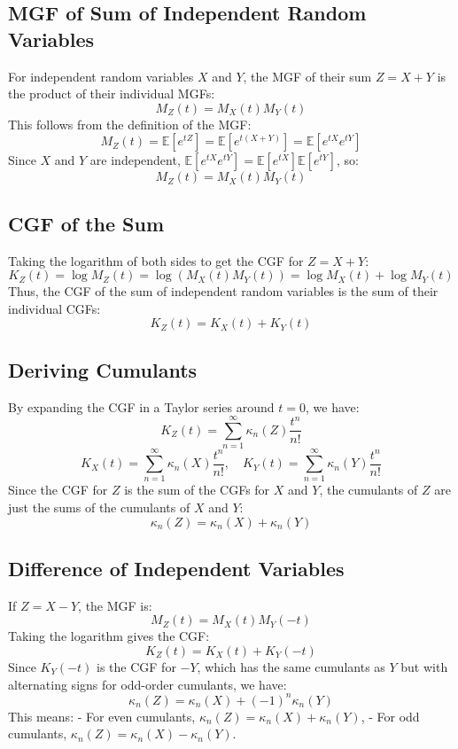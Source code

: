 \documentclass[11pt]{article}
\begin{document}
		\subsection*{MGF of Sum of Independent Random Variables}
		For independent random variables \( X \) and \( Y \), the MGF of their sum \( Z = X + Y \) is the product of their individual MGFs:
		\[
		M_Z(t) = M_X(t) M_Y(t)
		\]
		This follows from the definition of the MGF:
		\[
		M_Z(t) = \mathbb{E}[e^{tZ}] = \mathbb{E}[e^{t(X + Y)}] = \mathbb{E}[e^{tX} e^{tY}]
		\]
		Since \( X \) and \( Y \) are independent, \( \mathbb{E}[e^{tX} e^{tY}] = \mathbb{E}[e^{tX}] \mathbb{E}[e^{tY}] \), so:
		\[
		M_Z(t) = M_X(t) M_Y(t)
		\]
			
		\subsection*{CGF of the Sum}
		Taking the logarithm of both sides to get the CGF for \( Z = X + Y \):
		\[
		K_Z(t) = \log M_Z(t) = \log(M_X(t) M_Y(t)) = \log M_X(t) + \log M_Y(t)
		\]
		Thus, the CGF of the sum of independent random variables is the sum of their individual CGFs:
		\[
		K_Z(t) = K_X(t) + K_Y(t)
		\]
			
		\subsection*{Deriving Cumulants}
		By expanding the CGF in a Taylor series around \( t = 0 \), we have:
		\[
		K_Z(t) = \sum_{n=1}^{\infty} \kappa_n(Z) \frac{t^n}{n!}
		\]
		\[
		K_X(t) = \sum_{n=1}^{\infty} \kappa_n(X) \frac{t^n}{n!}, \quad K_Y(t) = \sum_{n=1}^{\infty} \kappa_n(Y) \frac{t^n}{n!}
		\]
		Since the CGF for \( Z \) is the sum of the CGFs for \( X \) and \( Y \), the cumulants of \( Z \) are just the sums of the cumulants of \( X \) and \( Y \):
		\[
		\kappa_n(Z) = \kappa_n(X) + \kappa_n(Y)
		\]
			
		\subsection*{Difference of Independent Variables}
		If \( Z = X - Y \), the MGF is:
		\[
		M_Z(t) = M_X(t) M_Y(-t)
		\]
		Taking the logarithm gives the CGF:
		\[
		K_Z(t) = K_X(t) + K_Y(-t)
		\]
		Since \( K_Y(-t) \) is the CGF for \( -Y \), which has the same cumulants as \( Y \) but with alternating signs for odd-order cumulants, we have:
		\[
		\kappa_n(Z) = \kappa_n(X) + (-1)^n \kappa_n(Y)
		\]
		This means:
		- For even cumulants, \( \kappa_n(Z) = \kappa_n(X) + \kappa_n(Y) \),
		- For odd cumulants, \( \kappa_n(Z) = \kappa_n(X) - \kappa_n(Y) \).
		
\end{document}
